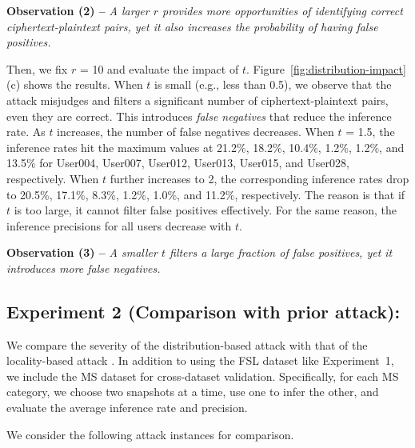 {\bf Observation (2) --} {\em A larger $r$ provides more opportunities of identifying correct ciphertext-plaintext pairs, yet it also increases the probability of having false positives.}   

Then, we fix $r$ = 10 and evaluate the impact of $t$.  Figure~\ref{fig:distribution-impact}(c) shows the results. When $t$ is small (e.g., less than 0.5), we observe that the attack misjudges and filters a significant number of ciphertext-plaintext pairs, even they are correct. This introduces {\em false negatives} that reduce the inference rate. As $t$ increases, the number of false negatives decreases.  When $t$ = 1.5, the inference rates hit the maximum values at 21.2\%, 18.2\%, 10.4\%, 1.2\%, 1.2\%, and 13.5\% for User004, User007, User012, User013, User015, and User028, respectively. When $t$ further increases to 2, the corresponding inference rates drop to 20.5\%, 17.1\%, 8.3\%, 1.2\%, 1.0\%, and 11.2\%, respectively. The reason is that if $t$ is too large, it cannot filter false positives effectively. For the same reason, the inference precisions for all users decrease with $t$.  

{\bf Observation (3) --} {\em A smaller $t$ filters a large fraction of false
positives, yet it introduces more false negatives.}   


\subsection{Experiment 2 (Comparison with prior attack):}
We compare the severity of the distribution-based attack with that of the locality-based attack \cite{li17}. In addition to using the FSL dataset like Experiment~1, we include the MS dataset for cross-dataset validation. Specifically, for each MS category, we choose two snapshots at a time, use one to infer the other, and evaluate the average inference rate and precision. 

We consider the following attack instances for comparison. 


